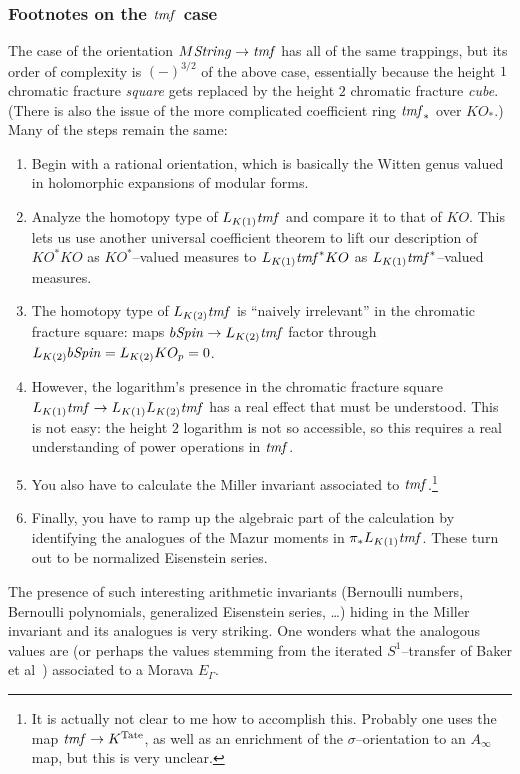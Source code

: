\subsubsection{Footnotes on the $\mathit{tmf}$ case}

The case of the orientation $M\mathit{String} \to \mathit{tmf}$ has all of the same trappings, but its order of complexity is $(-)^{3/2}$ of the above case, essentially because the height $1$ chromatic fracture \emph{square} gets replaced by the height $2$ chromatic fracture \emph{cube}.  (There is also the issue of the more complicated coefficient ring $\mathit{tmf}_*$ over $KO_*$.)  Many of the steps remain the same:
\begin{enumerate}
    \item Begin with a rational orientation, which is basically the Witten genus valued in holomorphic expansions of modular forms.
    \item Analyze the homotopy type of $L_{K(1)} \mathit{tmf}$ and compare it to that of $KO$.  This lets us use another universal coefficient theorem to lift our description of $KO^* KO$ as $KO^*$--valued measures to $L_{K(1)} \mathit{tmf}^* KO$ as $L_{K(1)} \mathit{tmf}^*$--valued measures.
    \item The homotopy type of $L_{K(2)} \mathit{tmf}$ is ``naively irrelevant'' in the chromatic fracture square: maps $b\mathit{Spin} \to L_{K(2)} \mathit{tmf}$ factor through $L_{K(2)} b\mathit{Spin} = L_{K(2)} KO_p = 0$.
    \item However, the logarithm's presence in the chromatic fracture square $L_{K(1)} \mathit{tmf} \to L_{K(1)} L_{K(2)} \mathit{tmf}$ has a real effect that must be understood.  This is not easy: the height $2$ logarithm is not so accessible, so this requires a real understanding of power operations in $\mathit{tmf}$.
    \item You also have to calculate the Miller invariant associated to $\mathit{tmf}$.\footnote{It is actually not clear to me how to accomplish this.  Probably one uses the map $\mathit{tmf} \to K^{\mathrm{Tate}}$, as well as an enrichment of the $\sigma$--orientation to an $A_\infty$ map, but this is very unclear.}
    \item Finally, you have to ramp up the algebraic part of the calculation by identifying the analogues of the Mazur moments in $\pi_* L_{K(1)} \mathit{tmf}$.  These turn out to be normalized Eisenstein series.
\end{enumerate}

\begin{remark}
The presence of such interesting arithmetic invariants (Bernoulli numbers, Bernoulli polynomials, generalized Eisenstein series, \ldots) hiding in the Miller invariant and its analogues is very striking.  One wonders what the analogous values are (or perhaps the values stemming from the iterated $S^1$--transfer of Baker et al~\cite{Barthel}) associated to a Morava $E_\Gamma$.
\end{remark}

